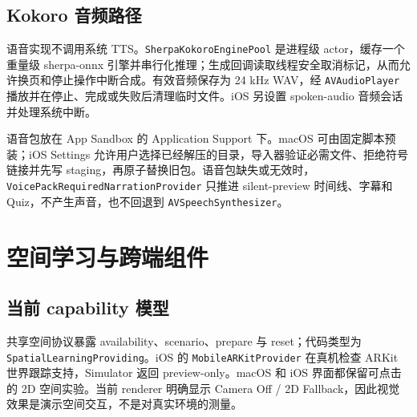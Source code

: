 \documentclass[11pt,a4paper,fontset=none]{ctexart}
\newcommand{\code}[1]{\begingroup\urlstyle{tt}\nolinkurl{#1}\endgroup}
\begin{document}
\subsection{Kokoro 音频路径}
语音实现不调用系统 TTS。\code{SherpaKokoroEnginePool} 是进程级 actor，缓存一个重量级 sherpa-onnx 引擎并串行化推理；生成回调读取线程安全取消标记，从而允许换页和停止操作中断合成。有效音频保存为 24 kHz WAV，经 \code{AVAudioPlayer} 播放并在停止、完成或失败后清理临时文件。iOS 另设置 spoken-audio 音频会话并处理系统中断。

语音包放在 App Sandbox 的 Application Support 下。macOS 可由固定脚本预装；iOS Settings 允许用户选择已经解压的目录，导入器验证必需文件、拒绝符号链接并先写 staging，再原子替换旧包。语音包缺失或无效时，\code{VoicePackRequiredNarrationProvider} 只推进 silent-preview 时间线、字幕和 Quiz，不产生声音，也不回退到 \code{AVSpeechSynthesizer}。

\section{空间学习与跨端组件}

\subsection{当前 capability 模型}
共享空间协议暴露 availability、scenario、prepare 与 reset；代码类型为 \code{SpatialLearningProviding}。iOS 的 \code{MobileARKitProvider} 在真机检查 ARKit 世界跟踪支持，Simulator 返回 preview-only。macOS 和 iOS 界面都保留可点击的 2D 空间实验。当前 renderer 明确显示 Camera Off / 2D Fallback，因此视觉效果是演示空间交互，不是对真实环境的测量。
\end{document}
